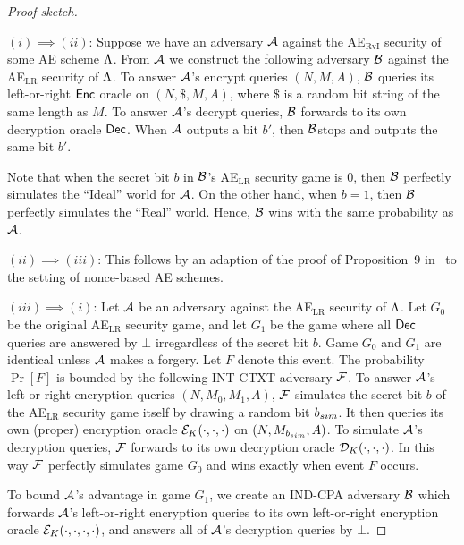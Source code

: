 \begin{proof}[Proof sketch]~

$(i) \implies (ii)$:
Suppose we have an adversary $\A$ against the AE$_{\text{RvI}}$ security of some AE scheme $\aeenc$.
From $\A$ we construct the following adversary $\A[B]$ against the AE$_\text{LR}$ security of $\aeenc$.
To answer $\A$'s encrypt queries $(N, M, A)$,
$\A[B]$ queries its left-or-right $\enc$ oracle on $(N, \$, M, A)$,
where $\$$ is a random bit string of the same length as $M$.
To answer $\A$'s decrypt queries,
$\A[B]$ forwards to its own decryption oracle $\dec$.
When $\A$ outputs a bit $b'$,
then $\A[B]$stops and outputs the same bit $b'$.

Note that when the secret bit $b$ in $\A[B]$'s  AE$_\text{LR}$ security game is $0$,
then $\A[B]$ perfectly simulates the ``Ideal'' world for $\A$.
On the other hand,
when $b = 1$,
then $\A[B]$ perfectly simulates the ``Real'' world.
Hence,
$\A[B]$ wins with the same probability as $\A$.
\medskip

$(ii) \implies (iii)$:
This follows by an adaption of the proof of Proposition~9 in~\cite{EPRINT:RogShr06} to the setting of nonce-based AE schemes.
\medskip

$(iii) \implies (i)$:
Let $\A$ be an adversary against the AE$_\text{LR}$ security of $\aeenc$.
Let $G_0$ be the original AE$_\text{LR}$ security game,
and let $G_1$ be the game where all $\dec$ queries are answered by $\bot$ irregardless of the secret bit $b$. 
Game $G_0$ and $G_1$ are identical unless $\A$ makes a forgery. 
Let $F$ denote this event.
The probability $\Pr[F]$ is bounded by the following INT-CTXT adversary $\A[F]$.
To answer $\A$'s left-or-right encryption queries $(N, M_0, M_1, A)$,
$\A[F]$ simulates the secret bit $b$ of the AE$_\text{LR}$ security game itself by drawing a random bit $\bsim$.
It then queries its own (proper) encryption oracle $\mathcal{E}_\Key(\cdot, \cdot, \cdot)$ on $(N, M_{\bsim}, A)$.
To simulate $\A$'s decryption queries,
$\A[F]$ forwards to its own decryption oracle $\mathcal{D}_\Key(\cdot, \cdot, \cdot)$.
In this way $\A[F]$ perfectly simulates game $G_0$ and wins exactly when event $F$ occurs.

To bound $\A$'s advantage in game $G_1$,
we create an IND-CPA adversary $\A[B]$ which forwards $\A$'s left-or-right encryption queries to its own left-or-right encryption oracle $\mathcal{E}_\Key(\cdot, \cdot, \cdot, \cdot)$,
and answers all of $\A$'s decryption queries by $\bot$.  
\end{proof}


